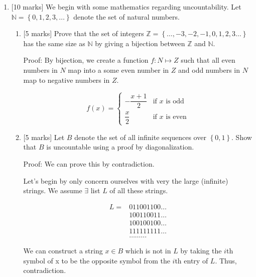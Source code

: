 \documentclass{article}
\newcommand{\set}[1]{{\left\{#1\right\}}}    %
\newcommand{\ints}{{\mathbb Z}}
\newcommand{\nats}{{\mathbb N}}
\begin{document}
\begin{enumerate}
    \item {[10 marks]} We begin with some mathematics regarding uncountability. Let $\nats=\set{0, 1,2,3,\ldots}$ denote the set of natural numbers.
    \begin{enumerate}
        \item {[5 marks]}  Prove that the set of integers $\ints=\set{\ldots,-3,-2,-1,0,1,2,3\ldots}$ has the same size as $\nats$ by giving a bijection between $\ints$ and $\nats$.

                Proof: By bijection, we create a function $f: N \mapsto Z$ such that all even numbers in $N$ map into a some even number in $Z$ and odd numbers in $N$ map to negative numbers in $Z$.

                \[ f(x) = \begin{cases}
                  -\dfrac{x+1}{2}    & \text{if $x$ is odd}     \\
                  \dfrac{x}{2}       & \text{if $x$ is even}
               	\end{cases}
                \]

        \item {[5 marks]}  Let $B$ denote the set of all infinite sequences over $\set{0,1}$. Show that $B$ is uncountable using a proof by diagonalization.

                Proof: We can prove this by contradiction.

                Let's begin by only concern ourselves with very the large (infinite) strings.
                We assume $\exists$ list $L$ of all these strings.

                \begin{equation}
                    \begin{split}
                        L = & 011001100\ldots \\
                            & 100110011\ldots \\
                            & 100100100\ldots \\
                            & 111111111\ldots \\
                            & \ldots\ldots\ldots
                    \end{split}
                \end{equation}

                We can construct a string $x \in B$ which is not in $L$ by taking the $i$th symbol of x to be the opposite symbol from the $i$th entry of $L$. Thus, contradiction.


\end{enumerate}
\end{enumerate}
\end{document}
